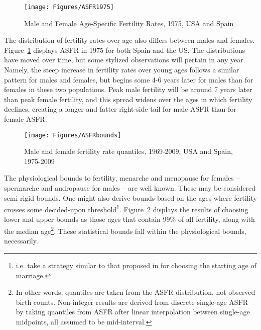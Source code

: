 \begin{figure}[ht!]
        \centering  
          \caption{Male and Female Age-Specific Fertility Rates, 1975, USA and
          Spain}
           \texttt{[image: Figures/ASFR1975]}  
          \label{fig:ASFR1975}
\end{figure}

The distribution of fertility rates over age also differs between males and
females. Figure~\ref{fig:ASFR1975} displays ASFR in 1975 for both Spain and the
US. The distributions have moved over time, but some stylized observations will
pertain in any year. Namely, the steep increase in fertility rates over young
ages follows a similar pattern for males and females, but begins some 4-6 years
later for males than for females in these two populations. Peak male fertility
will be around 7 years later than peak female fertility, and this spread widens
over the ages in which fertility declines, creating a longer and fatter
right-side tail for male ASFR than for female ASFR. 

\begin{figure}[ht!]
        \centering  
          \caption{Male and female fertility rate quantiles, 1969-2009, USA and
          Spain, 1975-2009}
           \texttt{[image: Figures/ASFRbounds]}
          \label{fig:TFRboundsseries}
\end{figure}

The physiological bounds to fertility, menarche and menopause for
females -- spermarche and andropause for males -- are well known. These may be
considered semi-rigid bounds. One might also derive bounds based on the ages
where fertility crosses some decided-upon threshold\footnote{i.e. take a
strategy similar to that proposed in \citet{coale1971age} for choosing the
starting age of marriage.}. Figure~\ref{fig:TFRboundsseries} displays the
results of choosing lower and upper bounds as those ages that contain 99\% of
all fertility, along with the median age\footnote{In other words, quantiles are
taken from the ASFR distribution, not observed birth counts. Non-integer results are derived from
discrete single-age ASFR by taking quantiles from ASFR after linear
interpolation between single-age midpoints, all assumed to be mid-interval.}. 
These statistical bounds fall within the physiological bounds, necessarily. 

